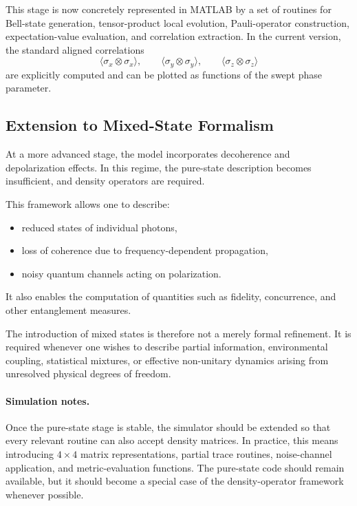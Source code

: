\documentclass[a4paper]{article}
\begin{document}
This stage is now concretely represented in MATLAB by a set of routines for Bell-state generation, tensor-product local evolution, Pauli-operator construction, expectation-value evaluation, and correlation extraction. In the current version, the standard aligned correlations
\[
\langle \sigma_x \otimes \sigma_x \rangle,\qquad
\langle \sigma_y \otimes \sigma_y \rangle,\qquad
\langle \sigma_z \otimes \sigma_z \rangle
\]
are explicitly computed and can be plotted as functions of the swept phase parameter.

\subsection{Extension to Mixed-State Formalism}

At a more advanced stage, the model incorporates decoherence and depolarization effects. In this regime, the pure-state description becomes insufficient, and density operators are required.

This framework allows one to describe:
\begin{itemize}
    \item reduced states of individual photons,
    \item loss of coherence due to frequency-dependent propagation,
    \item noisy quantum channels acting on polarization.
\end{itemize}

It also enables the computation of quantities such as fidelity, concurrence, and other entanglement measures.

The introduction of mixed states is therefore not a merely formal refinement. It is required whenever one wishes to describe partial information, environmental coupling, statistical mixtures, or effective non-unitary dynamics arising from unresolved physical degrees of freedom.

\paragraph{Simulation notes.}
Once the pure-state stage is stable, the simulator should be extended so that every relevant routine can also accept density matrices. In practice, this means introducing \(4 \times 4\) matrix representations, partial trace routines, noise-channel application, and metric-evaluation functions. The pure-state code should remain available, but it should become a special case of the density-operator framework whenever possible.
\end{document}
